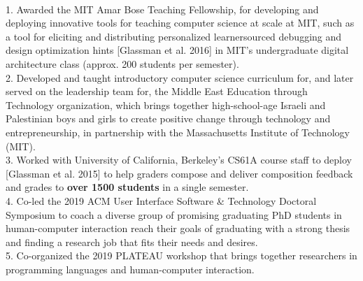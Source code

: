 \documentclass[11pt]{article}
\begin{document}
\\
1. Awarded the MIT Amar Bose Teaching Fellowship, for developing and deploying innovative tools for teaching computer science at scale at MIT, such as a tool for eliciting and distributing personalized learnersourced debugging and design optimization hints [Glassman et al. 2016] in MIT's undergraduate digital architecture class (approx. 200 students per semester).\\[2pt]
2. Developed and taught introductory computer science curriculum for, and later served on the leadership team for, the Middle East Education through Technology organization, which brings together high-school-age Israeli and Palestinian boys and girls to create positive change through technology and entrepreneurship, in partnership with the Massachusetts Institute of Technology (MIT).\\[2pt]
3. Worked with University of California, Berkeley's CS61A course staff to deploy  [Glassman et al. 2015] to help graders compose and deliver composition feedback and grades to {\bf over 1500 students} in a single semester.\\[2pt]
4. Co-led the 2019 ACM User Interface Software \& Technology Doctoral Symposium to coach a diverse group of promising graduating PhD students in human-computer interaction reach their goals of graduating with a strong thesis and finding a research job that fits their needs and desires.\\[2pt]
5. Co-organized the 2019 PLATEAU workshop that brings together researchers in programming languages and human-computer interaction.\\[2pt]
\end{document}
